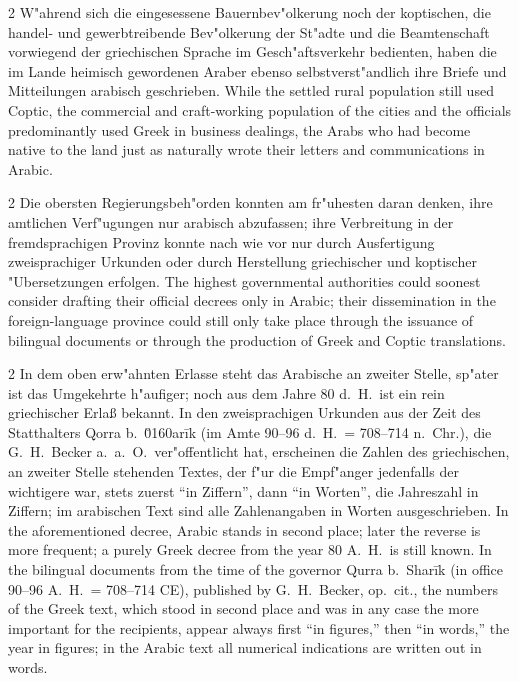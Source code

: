 \documentclass[10pt,a4paper]{article}
\renewcommand{\switchcolumn}{\syncronize\nointerlineskip\columnbreak}
\newcommand{\enquote}[1]{``#1''}
\begin{document}
\begin{paracol}{2}
W"ahrend sich die eingesessene Bauernbev"olkerung noch der koptischen, die handel- und gewerbtreibende Bev"olkerung der St"adte und die Beamtenschaft vorwiegend der griechischen Sprache im Gesch"aftsverkehr bedienten, haben die im Lande heimisch gewordenen Araber ebenso selbstverst"andlich ihre Briefe und Mitteilungen arabisch geschrieben.
\switchcolumn
While the settled rural population still used Coptic, the commercial and craft-working population of the cities and the officials predominantly used Greek in business dealings, the Arabs who had become native to the land just as naturally wrote their letters and communications in Arabic.
\end{paracol}

\begin{paracol}{2}
Die obersten Regierungsbeh"orden konnten am fr"uhesten daran denken, ihre amtlichen Verf"ugungen nur arabisch abzufassen; ihre Verbreitung in der fremdsprachigen Provinz konnte nach wie vor nur durch Ausfertigung zweisprachiger Urkunden oder durch Herstellung griechischer und koptischer "Ubersetzungen erfolgen.
\switchcolumn
The highest governmental authorities could soonest consider drafting their official decrees only in Arabic; their dissemination in the foreign-language province could still only take place through the issuance of bilingual documents or through the production of Greek and Coptic translations.
\end{paracol}

\begin{paracol}{2}
In dem oben erw"ahnten Erlasse steht das Arabische an zweiter Stelle, sp"ater ist das Umgekehrte h"aufiger; noch aus dem Jahre 80 d.\ H.\ ist ein rein griechischer Erla\ss{} bekannt. In den zweisprachigen Urkunden aus der Zeit des Statthalters Qorra b.\ \u0160ar\={i}k (im Amte 90--96 d.\ H.\ = 708--714 n.\ Chr.), die G.\ H.\ Becker a.\ a.\ O.\ ver"offentlicht hat, erscheinen die Zahlen des griechischen, an zweiter Stelle stehenden Textes, der f"ur die Empf"anger jedenfalls der wichtigere war, stets zuerst \enquote{in Ziffern}, dann \enquote{in Worten}, die Jahreszahl in Ziffern; im arabischen Text sind alle Zahlenangaben in Worten ausgeschrieben.
\switchcolumn
In the aforementioned decree, Arabic stands in second place; later the reverse is more frequent; a purely Greek decree from the year 80 A.\ H.\ is still known. In the bilingual documents from the time of the governor Qurra b.\ Shar\={i}k (in office 90--96 A.\ H.\ = 708--714 CE), published by G.\ H.\ Becker, op.\ cit., the numbers of the Greek text, which stood in second place and was in any case the more important for the recipients, appear always first ``in figures,'' then ``in words,'' the year in figures; in the Arabic text all numerical indications are written out in words.
\end{paracol}
\end{document}
